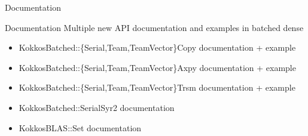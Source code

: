 \begin{frame}[fragile]

  {\Huge Documentation}

  \vspace{10pt}

\end{frame}

\begin{frame}[fragile]{Documentation}
  Multiple new API documentation and examples in batched dense
  \begin{itemize}
    \item {\ttfamily KokkosBatched::\{Serial,Team,TeamVector\}Copy} documentation + example
    \item {\ttfamily KokkosBatched::\{Serial,Team,TeamVector\}Axpy} documentation + example
    \item {\ttfamily KokkosBatched::\{Serial,Team,TeamVector\}Trsm} documentation + example
    \item {\ttfamily KokkosBatched::SerialSyr2} documentation
    \item {\ttfamily KokkosBLAS::Set} documentation
  \end{itemize}
\end{frame}
